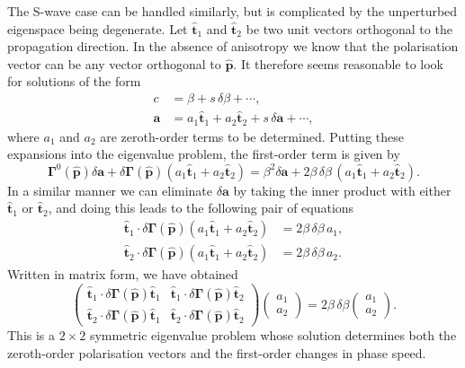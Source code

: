 The S-wave case can be handled similarly, but is complicated by the unperturbed eigenspace being degenerate. Let $\hat{\mathbf{t}}_{1}$ 
and $\hat{\mathbf{t}}_{2}$ be two unit vectors orthogonal to the propagation direction. In the absence of anisotropy we know that 
the polarisation vector can be any vector orthogonal to $\hat{\mathbf{p}}$. It therefore seems reasonable to look for solutions of the form
\begin{align}
c&=\beta+s\,\delta\beta+\cdots, \label{eq:39}\\
\mathbf{a}&=a_{1}\hat{\mathbf{t}}_{1}+a_{2}\hat{\mathbf{t}}_{2}+s\,\delta \mathbf{a}+\cdots, \label{eq:40}
\end{align}
where $a_{1}$ and $a_{2}$ are zeroth-order terms to be determined. Putting these expansions into the eigenvalue problem, the 
first-order term is given by
\begin{equation}
\bm{\Gamma}^{0}(\hat{\mathbf{p}})\delta \mathbf{a}+\delta\bm{\Gamma}(\hat{\mathbf{p}})(a_{1}\hat{\mathbf{t}}_{1}+
a_{2}\hat{\mathbf{t}}_{2})=\beta^{2}\delta \mathbf{a}+2\beta\,\delta\beta\,(a_{1}\hat{\mathbf{t}}_{1}+a_{2}\hat{\mathbf{t}}_{2}).
\label{eq:41}
\end{equation}
In a similar manner we can eliminate $\delta \mathbf{a}$ by taking the inner product with either $\hat{\mathbf{t}}_{1}$ or 
$\hat{\mathbf{t}}_{2}$, and doing this leads to the following pair of equations
\begin{align}
\hat{\mathbf{t}}_{1}\cdot\delta\bm{\Gamma}(\hat{\mathbf{p}})(a_{1}\hat{\mathbf{t}}_{1}+a_{2}\hat{\mathbf{t}}_{2})&=2\beta\,\delta\beta\, a_{1}, \label{eq:42}\\
\hat{\mathbf{t}}_{2}\cdot\delta\bm{\Gamma}(\hat{\mathbf{p}})(a_{1}\hat{\mathbf{t}}_{1}+a_{2}\hat{\mathbf{t}}_{2})&=2\beta\,\delta\beta\, a_{2}. \label{eq:43}
\end{align}
Written in matrix form, we have obtained
\begin{equation}
\begin{pmatrix} \hat{\mathbf{t}}_{1}\cdot\delta\bm{\Gamma}(\hat{\mathbf{p}})\hat{\mathbf{t}}_{1} & \hat{\mathbf{t}}_{1}
    \cdot\delta\bm{\Gamma}(\hat{\mathbf{p}})\hat{\mathbf{t}}_{2} \\ \hat{\mathbf{t}}_{2}\cdot\delta\bm{\Gamma}(\hat{\mathbf{p}})\hat{\mathbf{t}}_{1} & 
    \hat{\mathbf{t}}_{2}\cdot\delta\bm{\Gamma}(\hat{\mathbf{p}})\hat{\mathbf{t}}_{2} \end{pmatrix} \begin{pmatrix} a_{1}
         \\ a_{2} \end{pmatrix} = 2\beta\,\delta\beta \begin{pmatrix} a_{1} \\ a_{2} \end{pmatrix}.
\label{eq:44}
\end{equation}
This is a $2\times2$ symmetric eigenvalue problem whose solution determines both the zeroth-order polarisation vectors 
and the first-order changes in phase speed. 


